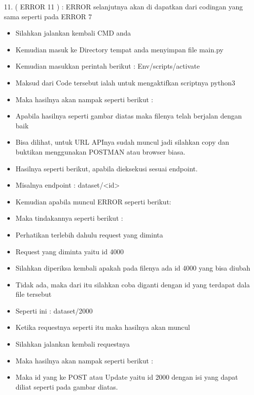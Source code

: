 11. ( ERROR 11 ) : ERROR selanjutnya akan di dapatkan dari codingan yang sama seperti pada ERROR 7 
\begin{itemize}
\item Silahkan jalankan kembali CMD anda 
\item Kemudian masuk ke Directory tempat anda menyimpan file main.py 
\item Kemudian masukkan perintah berikut : Env/scripts/activate 
\item Maksud dari Code tersebut ialah untuk mengaktifkan scriptnya python3 
\item Maka hasilnya akan nampak seperti berikut : 
\item Apabila hasilnya seperti gambar diatas maka filenya telah berjalan dengan baik 
\item Bisa dilihat, untuk URL APInya sudah muncul jadi silahkan copy dan buktikan menggunakan POSTMAN atau browser biasa. 
\item Hasilnya seperti berikut, apabila dieksekusi sesuai endpoint. 
\item Misalnya endpoint : dataset/<id> 
\item Kemudian apabila muncul ERROR seperti berikut: 
\item Maka tindakannya seperti berikut : 
\item Perhatikan terlebih dahulu request yang diminta 
\item Request yang diminta yaitu id 4000 
\item Silahkan diperiksa kembali apakah pada filenya ada id 4000 yang bisa diubah 
\item Tidak ada, maka dari itu silahkan coba  diganti dengan id yang terdapat dala file tersebut 
\item Seperti ini : dataset/2000 
\item Ketika requestnya seperti itu maka hasilnya akan muncul
\item Silahkan jalankan kembali requestnya 
\item Maka hasilnya akan nampak seperti berikut : 
\item Maka id yang ke POST atau Update yaitu id 2000 dengan isi yang dapat diliat seperti pada gambar diatas.
\end{itemize}